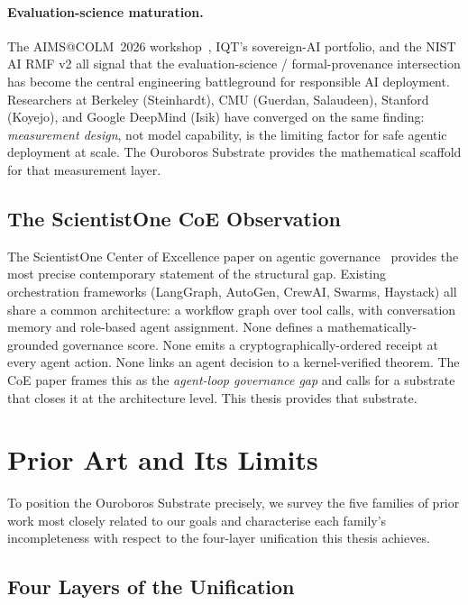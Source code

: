 \paragraph{Evaluation-science maturation.}
The AIMS@COLM~2026 workshop~\cite{aims2026colm}, IQT's sovereign-AI
portfolio, and the NIST AI RMF v2 all signal that the evaluation-science
/ formal-provenance intersection has become the central engineering
battleground for responsible AI deployment.
Researchers at Berkeley (Steinhardt), CMU (Guerdan, Salaudeen), Stanford
(Koyejo), and Google DeepMind (Isik) have converged on the same finding:
\emph{measurement design}, not model capability, is the limiting factor
for safe agentic deployment at scale.
The Ouroboros Substrate provides the mathematical scaffold for that
measurement layer.

\subsection{The ScientistOne CoE Observation}
\label{ssec:coe}

The ScientistOne Center of Excellence paper on agentic
governance~\cite{scientistoneCoE} provides the most precise contemporary
statement of the structural gap.
Existing orchestration frameworks (LangGraph, AutoGen, CrewAI, Swarms,
Haystack) all share a common architecture: a workflow graph over tool
calls, with conversation memory and role-based agent assignment.
None defines a mathematically-grounded governance score.
None emits a cryptographically-ordered receipt at every agent action.
None links an agent decision to a kernel-verified theorem.
The CoE paper frames this as the \emph{agent-loop governance gap} and
calls for a substrate that closes it at the architecture level.
This thesis provides that substrate.


\section{Prior Art and Its Limits}
\label{sec:priorart}

To position the Ouroboros Substrate precisely, we survey the five
families of prior work most closely related to our goals and characterise
each family's incompleteness with respect to the four-layer unification
this thesis achieves.

\subsection{Four Layers of the Unification}
\label{ssec:fourlayers}

